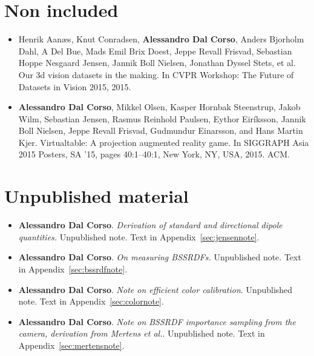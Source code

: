 \section*{Non included}
\begin{itemize}
\item Henrik Aanæs, Knut Conradsen, \textbf{Alessandro Dal Corso}, Anders Bjorholm Dahl, A Del Bue, Mads Emil Brix Doest, Jeppe Revall Frisvad, Sebastian Hoppe Nesgaard Jensen, Jannik Boll Nielsen, Jonathan Dyssel Stets, et al. Our 3d vision datasets in the making. In CVPR Workshop: The Future of Datasets in Vision 2015, 2015.~\cite{aanaes2015our}
\item \textbf{Alessandro Dal Corso}, Mikkel Olsen, Kasper Hornbak Steenstrup, Jakob Wilm, Sebastian Jensen, Rasmus Reinhold Paulsen, Eythor Eiríksson, Jannik Boll Nielsen, Jeppe Revall Frisvad, Gudmundur Einarsson, and Hans Martin Kjer. Virtualtable: A projection augmented reality game. In SIGGRAPH Asia 2015 Posters, SA ’15, pages 40:1–40:1, New York, NY, USA, 2015. ACM.~\cite{dalcorsosig15}
\end{itemize}

\section*{Unpublished material}
\begin{itemize}
\item \textbf{Alessandro Dal Corso}. \textit{Derivation of standard and directional dipole quantities.} Unpublished note. Text in Appendix~\ref{sec:jensennote}.
\item \textbf{Alessandro Dal Corso}. \textit{On measuring BSSRDFs.} Unpublished note. Text in Appendix~\ref{sec:bssrdfnote}.
\item \textbf{Alessandro Dal Corso}. \textit{Note on efficient color calibration}. Unpublished note. Text in Appendix~\ref{sec:colornote}.
\item \textbf{Alessandro Dal Corso}. \textit{Note on BSSRDF importance sampling from the camera, derivation from Mertens et al.}. Unpublished note. Text in Appendix~\ref{sec:mertensnote}.
\end{itemize}


